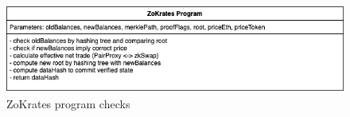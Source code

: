 \documentclass[../../thesis.tex]{subfiles}
\begin{document}
\begin{figure}[h]
    \centerline{\includegraphics[totalheight=3cm]{diagrams/zokrates.png}}
    \caption{ZoKrates program checks}
    \label{fig:zokrates}
\end{figure}









\end{document}
